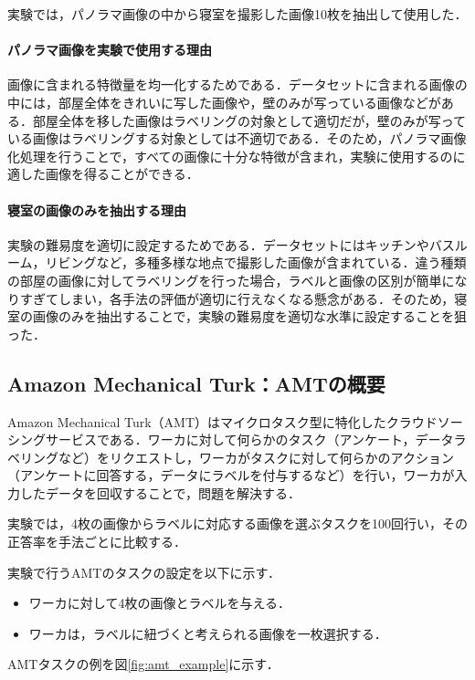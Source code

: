 \documentclass[a4paper,11pt]{jreport}
\begin{document}
実験では，パノラマ画像の中から寝室を撮影した画像10枚を抽出して使用した．

\paragraph{パノラマ画像を実験で使用する理由}
画像に含まれる特徴量を均一化するためである．データセットに含まれる画像の中には，部屋全体をきれいに写した画像や，壁のみが写っている画像などがある．部屋全体を移した画像はラベリングの対象として適切だが，壁のみが写っている画像はラベリングする対象としては不適切である．そのため，パノラマ画像化処理を行うことで，すべての画像に十分な特徴が含まれ，実験に使用するのに適した画像を得ることができる．

\paragraph{寝室の画像のみを抽出する理由}
実験の難易度を適切に設定するためである．データセットにはキッチンやバスルーム，リビングなど，多種多様な地点で撮影した画像が含まれている．違う種類の部屋の画像に対してラベリングを行った場合，ラベルと画像の区別が簡単になりすぎてしまい，各手法の評価が適切に行えなくなる懸念がある．そのため，寝室の画像のみを抽出することで，実験の難易度を適切な水準に設定することを狙った．

\subsection{Amazon Mechanical Turk：AMTの概要}

Amazon Mechanical Turk（AMT）はマイクロタスク型に特化したクラウドソーシングサービスである．ワーカに対して何らかのタスク（アンケート，データラベリングなど）をリクエストし，ワーカがタスクに対して何らかのアクション（アンケートに回答する，データにラベルを付与するなど）を行い，ワーカが入力したデータを回収することで，問題を解決する．

実験では，4枚の画像からラベルに対応する画像を選ぶタスクを100回行い，その正答率を手法ごとに比較する．

実験で行うAMTのタスクの設定を以下に示す．

\begin{itemize}
  \item ワーカに対して4枚の画像とラベルを与える．
  \item ワーカは，ラベルに紐づくと考えられる画像を一枚選択する．
\end{itemize}

AMTタスクの例を図\ref{fig:amt_example}に示す．
\end{document}
